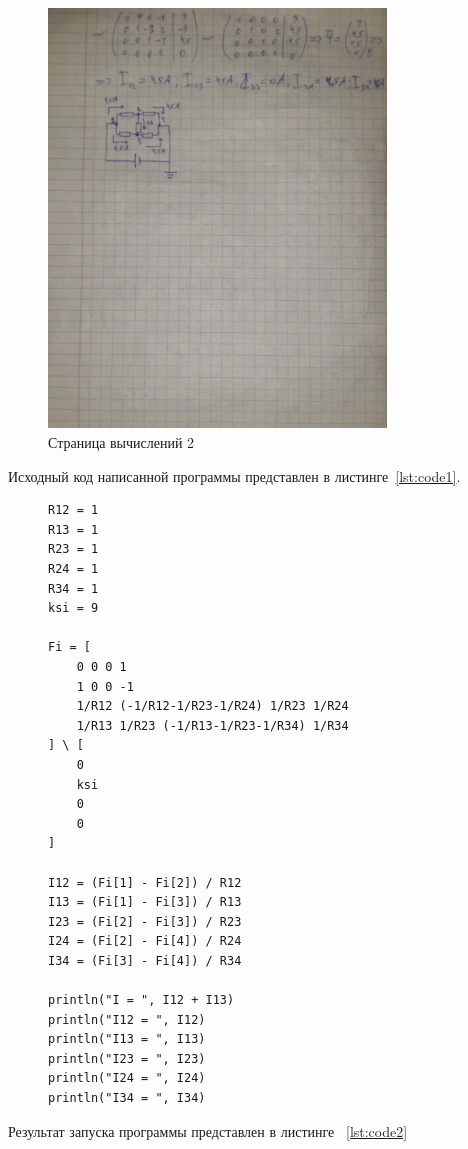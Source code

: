 \documentclass[a4paper, 14pt]{extarticle}
\begin{document}
\begin{figure}[!htb]
	\centering
	\includegraphics[width=0.8\textwidth]{img2}
\caption{Страница вычислений 2}
\label{fig:img2}
\end{figure}

Исходный код написанной программы представлен в листинге~\ref{lst:code1}.

\begin{figure}[!htb]
\begin{lstlisting}[caption={Программа вычисления значений сил токов на цепи},label={lst:code1}]
R12 = 1
R13 = 1
R23 = 1
R24 = 1
R34 = 1
ksi = 9

Fi = [
    0 0 0 1
    1 0 0 -1
    1/R12 (-1/R12-1/R23-1/R24) 1/R23 1/R24
    1/R13 1/R23 (-1/R13-1/R23-1/R34) 1/R34
] \ [
    0
    ksi
    0
    0
]

I12 = (Fi[1] - Fi[2]) / R12
I13 = (Fi[1] - Fi[3]) / R13
I23 = (Fi[2] - Fi[3]) / R23
I24 = (Fi[2] - Fi[4]) / R24
I34 = (Fi[3] - Fi[4]) / R34

println("I = ", I12 + I13)
println("I12 = ", I12)
println("I13 = ", I13)
println("I23 = ", I23)
println("I24 = ", I24)
println("I34 = ", I34)
\end{lstlisting}
\end{figure}

Результат запуска программы представлен в листинге ~\ref{lst:code2}
\end{document}
